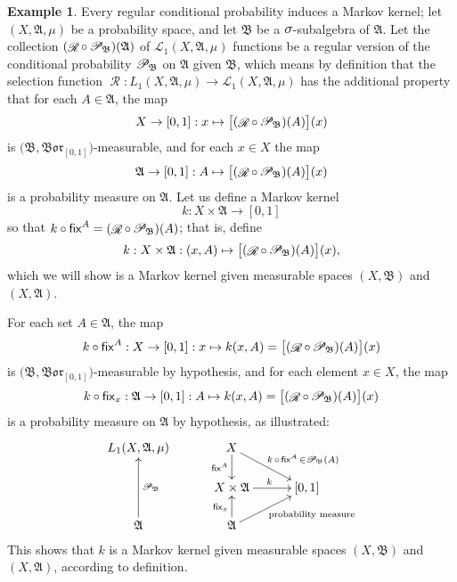 \documentclass[
twoside=true,
paper=letter,
fontsize=9pt,
pagesize=auto,
leqno,
openany,
headsepline,
overfullrule,
]{scrbook}
\theoremstyle{plain}
\theoremstyle{plain}
\theoremstyle{definition}
\newtheorem{example}[thm]{Example}
\theoremstyle{bfnoteitalic}
\theoremstyle{bfnoteroman}
\newcommand{\sigalg}[1]{\mathfrak{#1}}
\newcommand{\cali}[1]{\mathscr{#1}}
\newcommand{\sfop}[1]{\mathsf{#1}}
\newcommand{\condprobop}[1]{\mathop{\cali{P}\hspace{-1pt}}\nolimits_{#1}}
\newcommand{\borel}{\mathfrak{Bor}}
\newcommand{\textsigma}{\hbox{\large{$\sigma$}}\kern-1pt}
\newcommand{\sigmaalgebra}{\sigalg{A}}
\newcommand{\sigmaalgebraii}{\sigalg{B}}
\newcommand{\Lone}{L_1(\measurespace, \sigmaalgebra, \measure)}
\newcommand{\caliLone}{\cali{L}_1(\measurespace, \sigmaalgebra, \measure)}
\newcommand{\measurespace}{X}
\newcommand{\mspaceelt}{x}
\newcommand{\measure}{\mu}
\newcommand{\seti}{A}
\newcommand{\regular}{\mathop{\cali{R}}}
\newcommand{\markovkernel}{k}
\newcommand{\fixinthefirst}[1]{\sfop{fix}_{#1}}
\newcommand{\fixinthesecond}[1]{\sfop{fix}^{#1}}
\begin{document}
\begin{example}\label{regular_conditional_probability_induces_markov_kernel}
Every regular conditional probability induces a Markov kernel;
let $(\measurespace,\sigmaalgebra,\measure)$ be a probability space, and let $\sigmaalgebraii$ be a $\textsigma$-subalgebra of $\sigmaalgebra$.
Let the collection 
$(\regular\circ\condprobop{\sigmaalgebraii})(\sigmaalgebra)$ 
of 
$\caliLone$ functions
be a regular version of the conditional probability $\condprobop{\sigmaalgebraii}$ on $\sigmaalgebra$ given $\sigmaalgebraii$, which means by definition that the selection function 
$\regular:\Lone\to\caliLone$
has the additional property that for each $\seti\in\sigmaalgebra$, the map 
\[
\measurespace\to [0,1] : \mspaceelt\mapsto
\bigl[ (\regular\circ\condprobop{\sigmaalgebraii}) (\seti)\bigr](\mspaceelt)
\]
is $\bigl(\sigmaalgebraii, \borel_{[0,1]}\bigr)$\hyp{}measurable, and for each 
$\mspaceelt\in\measurespace$ the map
\[
\sigmaalgebra\to [0,1]: \seti \mapsto 
\bigl[ (\regular\circ\condprobop{\sigmaalgebraii}) (\seti)\bigr](\mspaceelt)
\]
is a probability measure on $\sigmaalgebra$.
Let us define a Markov kernel
\[
\markovkernel : \measurespace\times\sigmaalgebra \to [0,1]
\]
so that
$\markovkernel \circ\fixinthesecond{\seti}
=
(\regular\circ\condprobop{\sigmaalgebraii}) (\seti)$;
that is, define
\[
\markovkernel : \measurespace\times\sigmaalgebra
: (\mspaceelt,\seti)\mapsto  
\bigl[ (\regular\circ\condprobop{\sigmaalgebraii}) (\seti)\bigr](\mspaceelt),
\]
which we will show is a Markov kernel given measurable spaces $(\measurespace,\sigmaalgebraii)$ and $(\measurespace, \sigmaalgebra)$.


For each set $\seti\in\sigmaalgebra$, the map
\[
\markovkernel\circ\fixinthesecond{\seti}
: \measurespace\to [0,1]
: \mspaceelt\mapsto \markovkernel(\mspaceelt, \seti)
= 
\bigl[ (\regular\circ\condprobop{\sigmaalgebraii}) (\seti)\bigr](\mspaceelt)
\]
is  $\bigl(\sigmaalgebraii, \borel_{[0,1]}\bigr)$\hyp{}measurable by hypothesis, and for each element $\mspaceelt\in\measurespace$, the map
\[
\markovkernel\circ\fixinthefirst{\mspaceelt}
: \sigmaalgebra\to [0,1]
: \seti\mapsto
\markovkernel(\mspaceelt, \seti)
=
\bigl[ (\regular\circ\condprobop{\sigmaalgebraii}) (\seti)\bigr](\mspaceelt)
\]
is a probability measure on
$\sigmaalgebra$ by hypothesis, as illustrated:
\[
\xymatrix@R=16pt@C=30pt{ 
\Lone &
\measurespace \ar[d]_-{\fixinthesecond{\seti}} 
\ar[dr]^{\ \quad\markovkernel\,\circ\,\fixinthesecond{\seti}\,
\in
\condprobop{\sigmaalgebraii}(\seti)}
\\
&\measurespace\times\sigmaalgebra \ar[r]^{\markovkernel} & [0,1] 
\\
\sigmaalgebra \ar[uu]_{\condprobop{\sigmaalgebraii}} & \sigmaalgebra
\ar[ur]_{\qquad\text{probability measure}} \ar[u]^{\fixinthefirst{\mspaceelt}} & 
\\
}
\]
This shows that $\markovkernel$ is a Markov kernel given measurable spaces $(\measurespace,\sigmaalgebraii)$ and $(\measurespace, \sigmaalgebra)$, according to definition. 
\end{example}
\end{document}
